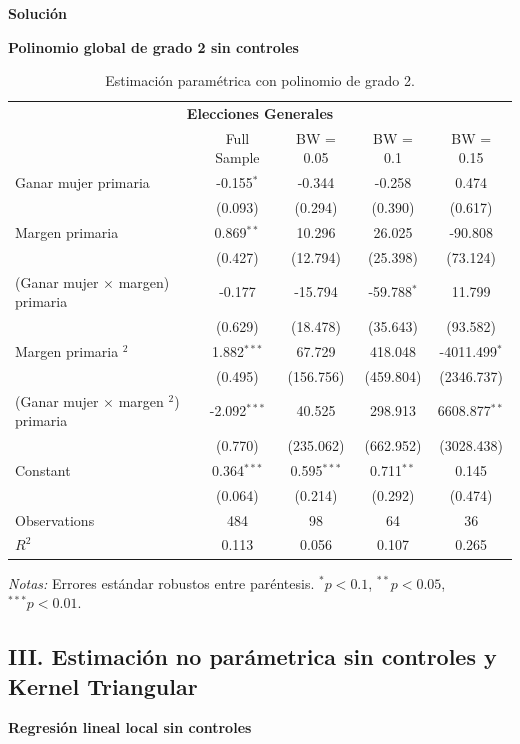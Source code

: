 \documentclass[a4paper, answers, addpoints, 11pt]{exam}
\newenvironment{solucion}{%
  \begin{mdframed}[
    backgroundcolor=blue!5,    %
    linecolor=blue!50,          %
    linewidth=2pt,              %
    leftmargin=10pt,            %
    rightmargin=8pt,           %
    topline=true,              %
    bottomline=true,            %
    roundcorner=10pt,           %
    innerleftmargin=10pt,       %
    innerrightmargin=10pt,      %
    innerbottommargin=10pt,     %
    innertopmargin=10pt         %
  ]%
  \begin{tcolorbox}[colframe=blue!50!black, colback=blue!50, coltitle=white, sharp corners=all, boxrule=1mm, width=\textwidth, halign=left, valign=center, top=0mm, bottom=0mm, left=0mm, right=0mm] \textbf{Solución} \end{tcolorbox} }{\end{mdframed}}
\begin{document}
\begin{enumerate}[resume]
\begin{enumerate}
\begin{solucion}
\textbf{Polinomio global de grado 2 sin controles}\\
\begin{table}[H]
\centering
\caption{Estimación paramétrica con polinomio de grado 2.}
\label{tab:interaction_quadratic}
\begin{tabular}{lcccc}
\toprule
\multicolumn{5}{c}{\textbf{Elecciones Generales}} \\
\cmidrule(lr){2-5}
& Full Sample & BW = 0.05 & BW = 0.1 & BW = 0.15 \\
\midrule
Ganar mujer primaria & -0.155$^{*}$ & -0.344 & -0.258 & 0.474 \\
& (0.093) & (0.294) & (0.390) & (0.617) \\
Margen primaria & 0.869$^{**}$ & 10.296 & 26.025 & -90.808 \\
& (0.427) & (12.794) & (25.398) & (73.124) \\
(Ganar mujer $\times$ margen) primaria & -0.177 & -15.794 & -59.788$^{*}$ & 11.799 \\
& (0.629) & (18.478) & (35.643) & (93.582) \\
Margen primaria $^2$ & 1.882$^{***}$ & 67.729 & 418.048 & -4011.499$^{*}$ \\
& (0.495) & (156.756) & (459.804) & (2346.737) \\
(Ganar mujer $\times$ margen $^2$) primaria  & -2.092$^{***}$ & 40.525 & 298.913 & 6608.877$^{**}$ \\
& (0.770) & (235.062) & (662.952) & (3028.438) \\
Constant & 0.364$^{***}$ & 0.595$^{***}$ & 0.711$^{**}$ & 0.145 \\
& (0.064) & (0.214) & (0.292) & (0.474) \\
\midrule
Observations & 484 & 98 & 64 & 36 \\
$R^2$ & 0.113 & 0.056 & 0.107 & 0.265 \\
\bottomrule
\end{tabular}
\begin{tablenotes}
\small
\item \textit{Notas:} Errores estándar robustos entre paréntesis. $^{*}p<0.1$, $^{**}p<0.05$, $^{***}p<0.01$.
\end{tablenotes}
\end{table}

 \subsection*{III. Estimación no parámetrica sin controles y Kernel Triangular}
\textbf{Regresión lineal local sin controles}


\end{solucion}
\end{enumerate}
\end{enumerate}
\end{document}
